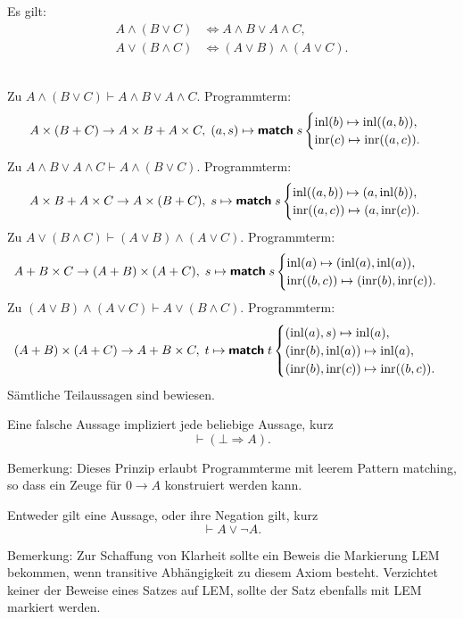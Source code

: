 \begin{Satz}%
\label{bool-dl}
Es gilt:
\begin{align}
A\land (B\lor C) &\iff A\land B\lor A\land C,\\
A\lor (B\land C) &\iff (A\lor B)\land (A\lor C).
\end{align}
\end{Satz}
\\
Zu $A\land (B\lor C) \vdash A\land B\lor A\land C$.
Programmterm:
\[A\times (B+C) \to A\times B + A\times C,\; (a, s)\mapsto \text{{\normalfont\sffamily\bfseries match}}\; s \begin{cases}
\operatorname{inl}(b)\mapsto \operatorname{inl}((a,b)),\\
\operatorname{inr}(c)\mapsto \operatorname{inr}((a,c)).
\end{cases}\]
Zu $A\land B\lor A\land C\vdash A\land (B\lor C)$.
Programmterm:
\[A\times B + A\times C\to A\times (B + C),\;
s\mapsto\text{{\normalfont\sffamily\bfseries match}}\; s\begin{cases}
\operatorname{inl}((a,b))\mapsto (a, \operatorname{inl}(b)),\\
\operatorname{inr}((a,c))\mapsto (a, \operatorname{inr}(c)).
\end{cases}
\]
Zu $A\lor (B\land C) \vdash (A\lor B)\land (A\lor C)$. Programmterm:
\[A+B\times C\to (A+B)\times (A+C),\;
s\mapsto\text{{\normalfont\sffamily\bfseries match}}\; s\begin{cases}
\operatorname{inl}(a)\mapsto (\operatorname{inl}(a),\operatorname{inl}(a)),\\
\operatorname{inr}((b,c))\mapsto (\operatorname{inr}(b),\operatorname{inr}(c)).
\end{cases} 
\]
Zu $(A\lor B)\land (A\lor C)\vdash A\lor (B\land C)$. Programmterm:
\[
(A+B)\times (A+C)\to A + B\times C,\;
t\mapsto\text{{\normalfont\sffamily\bfseries match}}\; t\begin{cases}
(\operatorname{inl}(a), s) \mapsto\operatorname{inl}(a),\\
(\operatorname{inr}(b), \operatorname{inl}(a)) \mapsto\operatorname{inl}(a),\\
(\operatorname{inr}(b), \operatorname{inr}(c)) \mapsto\operatorname{inr}((b, c)).
\end{cases}
\]
Sämtliche Teilaussagen sind bewiesen.\;\qedsymbol

\begin{Axiom}\label{PE}
Eine falsche Aussage impliziert jede beliebige Aussage, kurz
\[\vdash (\bot\Rightarrow A).\]
\end{Axiom}
Bemerkung: Dieses Prinzip erlaubt Programmterme mit leerem
Pattern matching, so dass ein Zeuge für $0\to A$ konstruiert
werden kann.

\begin{Axiom}\label{LEM}\newlinefirst
Entweder gilt eine Aussage, oder ihre Negation gilt, kurz
\[\vdash A\lor\neg A.\]
\end{Axiom}
Bemerkung: Zur Schaffung von Klarheit sollte ein Beweis die Markierung
LEM bekommen, wenn transitive Abhängigkeit zu diesem Axiom besteht.
Verzichtet keiner der Beweise eines Satzes auf LEM, sollte der Satz
ebenfalls mit LEM markiert werden.


